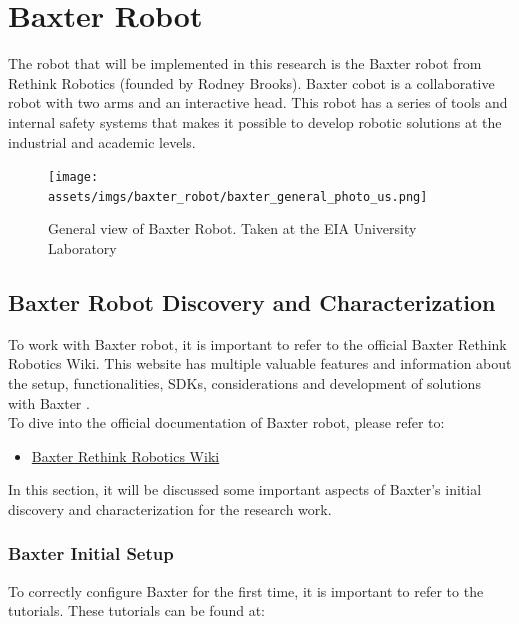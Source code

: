 \documentclass[11pt]{report} %
\begin{document}
\chapter{Baxter Robot}

The robot that will be implemented in this research is the Baxter robot from Rethink Robotics (founded by Rodney Brooks)\citep{cite_baxter_main_wiki}. Baxter cobot is a collaborative robot with two arms and an interactive head. This robot has a series of tools and internal safety systems that makes it possible to develop robotic solutions at the industrial and academic levels.\\

\begin{figure}[H]
    \centering
    \texttt{[image: assets/imgs/baxter\_robot/baxter\_general\_photo\_us.png]}
    \caption{General view of Baxter Robot. Taken at the EIA University Laboratory} 
    \label{fig_baxter_general_photo_us}
\end{figure}

\section{Baxter Robot Discovery and Characterization}

To work with Baxter robot, it is important to refer to the official Baxter Rethink Robotics Wiki. This website has multiple valuable features and information about the setup, functionalities, SDKs, considerations and development of solutions with Baxter \citep{cite_baxter_main_wiki}.\\

To dive into the official documentation of Baxter robot, please refer to:

\begin{itemize}
    \color{blue}
    \item \href{https://sdk.rethinkrobotics.com/wiki/Home}{Baxter Rethink Robotics Wiki}
\end{itemize}

In this section, it will be discussed some important aspects of Baxter's initial discovery and characterization for the research work.\\

\subsection{Baxter Initial Setup}

To correctly configure Baxter for the first time, it is important to refer to the  tutorials. These tutorials can be found at:
\end{document}
